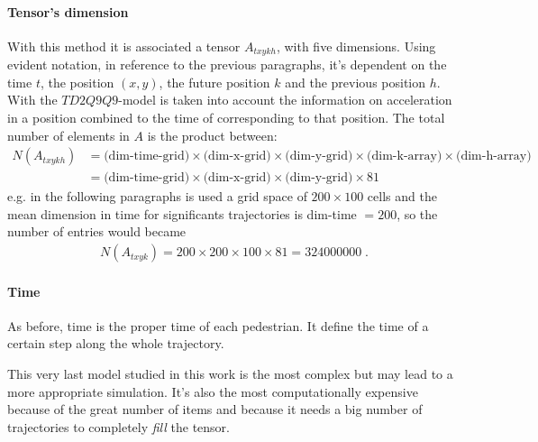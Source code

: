 \documentclass[class=article, crop=false]{standalone}
\begin{document}
\paragraph{Tensor's dimension}
With this method it is associated a tensor $A_{t x y k h}$, with five dimensions.
Using evident notation, in reference to the previous paragraphs, it's dependent on the time $t$, the position $(x, y)$, the future position $k$ and the previous position $h$.
With the $TD2Q9Q9$-model is taken into account the information on acceleration in a position combined to the time of corresponding to that position.
The total number of elements in $A$ is the product between:
\begin{equation*}
\begin{split}
N(A_{t xykh}) &= \mbox{(dim-time-grid)} \times \mbox{(dim-x-grid)} \times \mbox{(dim-y-grid)} \times \mbox{(dim-k-array)} \times \mbox{(dim-h-array)} \\
& = \mbox{(dim-time-grid)} \times \mbox{(dim-x-grid)} \times \mbox{(dim-y-grid)} \times 81
\end{split}
\end{equation*}
e.g. in the following paragraphs is used a grid space of $200\times100$ cells and the mean dimension in time for significants trajectories is dim-time $ = 200$, so the number of entries would became 
\begin{equation*}
\begin{split}
N(A_{t xyk})=200 \times 200\times100\times 81 = 324000000 \; .
\end{split}
\end{equation*}

\paragraph{Time}
As before, time is the proper time of each pedestrian.
It define the time of a certain step along the whole trajectory.

This very last model studied in this work is the most complex but may lead to a more appropriate simulation.
It's also the most computationally expensive because of the great number of items and 
because it needs a big number of trajectories to completely \emph{fill} the tensor.
\end{document}
